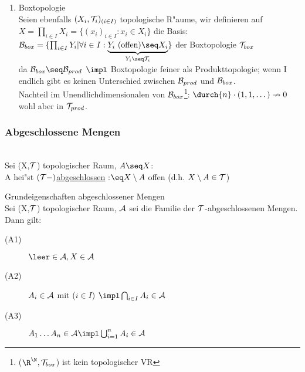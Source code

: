 \begin{beispiel}
\begin{enumerate}
\item Boxtopologie\\
Seien ebenfalls $(X_i,\mathcal T_i)_{(i\in I)}$ topologische R"aume, wir definieren auf $X=\prod_{i\in I}X_i=\{ (x_i)_{i\in I}:x_i\in X_i\}$ die Basis: $\B_{box}=\{ \prod_{i\in I}Y_i|\forall i\in I:\underbrace{Y_i\mbox{ (offen)}\seq X_i}_{Y_i\seq\T_i}\}$ der Boxtopologie $\mathcal T_{box}$\\
da $\B_{box}\seq \B_{prod}$ $\impl$ Boxtopologie feiner als Produkttopologie; wenn I endlich gibt es keinen Unterschied zwischen $\mathcal B_{prod}$ und $\mathcal B_{box}$.\\
Nachteil im Unendlichdimensionalen von $\mathcal B_{box}$\footnote{($\R^\N,\T_{box}$) ist kein topologischer VR}: $\durch{n}\cdot (1,1,\dots)\nrightarrow 0$ wohl aber in $\mathcal T_{prod}$.

\end{enumerate}
\end{beispiel}

\subsubsection{Abgeschlossene Mengen}

\begin{definition}\label{2.24}\\
Sei (X,$\mathcal T$) topologischer Raum, $A\seq X$:\\
A hei"st \ul{$(\mathcal T -)$abgeschlossen} :$\eq X\setminus A$ offen (d.h. $X\setminus A\in\mathcal T$)
\end{definition}

\begin{satz}\label{2.25}{\sc Grundeigenschaften abgeschlossener Mengen}\\
Sei (X,$\mathcal T$) topologischer Raum, $\mathcal A$ sei die Familie der $\mathcal T$-abgeschlossenen Mengen. Dann gilt:
\begin{description}
\item[(A1)] $\leer\in\A ,X\in\A$
\item[(A2)] $A_i\in\mathcal A$ mit ($i\in I$) $\impl \bigcap_{i\in I}A_i\in\A$
\item[(A3)] $A_1\dots A_n\in\A\impl \bigcup_{i=1}^nA_i\in\A$
\end{description}
\end{satz}

